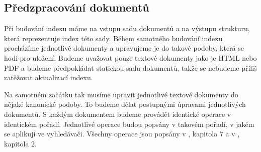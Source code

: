 \documentclass[12pt]{article}
\begin{document}
\subsection{Předzpracování dokumentů}
\label{prepr}
Při budování indexu máme na vstupu sadu dokumentů a na výstupu strukturu, která reprezentuje index této sady. Během samotného budování indexu procházíme jednotlivé dokumenty a upravujeme je do takové podoby, která se hodí pro uložení. Budeme uvažovat pouze textové dokumenty jako je HTML nebo PDF a budeme předpokládat statickou sadu dokumentů, takže se nebudeme příliš zatěžovat aktualizací indexu. 

Na samotném začátku tak musíme upravit jednotlivé textové dokumenty do nějaké kanonické podoby. To budeme dělat postupnými úpravami jednotlivých dokumentů. S každým dokumentem budeme provádět identické operace v identickém pořadí. Jednotlivé operace budou popsány v takovém pořadí, v jakém se aplikují ve vyhledávači. Všechny operace jsou popsány v \cite{modernir}, kapitola 7 a v \cite{introir}, kapitola 2.
\end{document}
